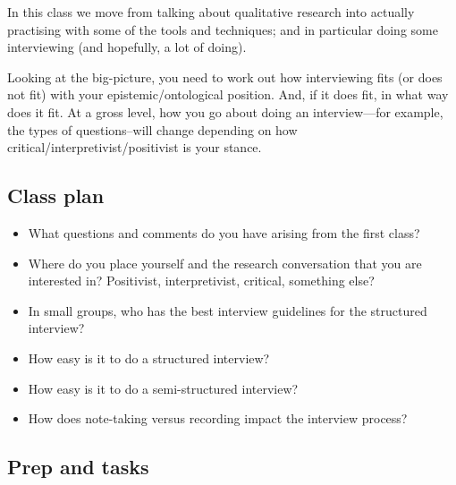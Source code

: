 \documentclass[]{book}
\theoremstyle{definition}
\theoremstyle{definition}
\theoremstyle{definition}
\theoremstyle{remark}
\begin{document}
In this class we move from talking about qualitative research into
actually practising with some of the tools and techniques; and in
particular doing some interviewing (and hopefully, a lot of doing).

Looking at the big-picture, you need to work out how interviewing fits
(or does not fit) with your epistemic/ontological position. And, if it
does fit, in what way does it fit. At a gross level, how you go about
doing an interview---for example, the types of questions--will change
depending on how critical/interpretivist/positivist is your stance.

\hypertarget{class-plan-1}{%
\subsection*{Class plan}\label{class-plan-1}}

\begin{itemize}
\item
  What questions and comments do you have arising from the first class?
\item
  Where do you place yourself and the research conversation that you are
  interested in? Positivist, interpretivist, critical, something else?
\item
  In small groups, who has the best interview guidelines for the
  structured interview?
\item
  How easy is it to do a structured interview?
\item
  How easy is it to do a semi-structured interview?
\item
  How does note-taking versus recording impact the interview process?
\end{itemize}

\hypertarget{prep-and-tasks-1}{%
\subsection*{Prep and tasks}\label{prep-and-tasks-1}}
\end{document}
